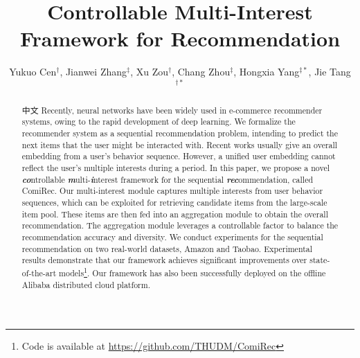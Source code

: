 \documentclass[sigconf]{acmart}
\newcommand{\model}{{ComiRec}}
\begin{document}
\fancyhead{}

\title{Controllable Multi-Interest Framework for Recommendation}

\author[Y. Cen, J. Zhang, X. Zou, C. Zhou, H. Yang and J. Tang]{
    Yukuo Cen$^{\dagger}$, Jianwei Zhang$^{\ddagger}$, Xu Zou$^{\dagger}$, Chang Zhou$^{\ddagger}$, Hongxia Yang$^{\ddagger*}$, Jie Tang$^{\dagger*}$
}


\renewcommand{\authors}{Yukuo Cen, Jianwei Zhang, Xu Zou, Chang Zhou, Hongxia Yang and Jie Tang}
\renewcommand{\shortauthors}{Y. Cen et al.}


\begin{abstract}
\renewcommand{\thefootnote}{\fnsymbol{footnote}}
\renewcommand{\thefootnote}{\arabic{footnote}}

中文
Recently, neural networks have been widely used in e-commerce recommender systems, owing to the rapid development of deep learning. 
We formalize the recommender system as a sequential recommendation problem, intending to predict the next items that the user might be interacted with. 
Recent works usually give an overall embedding from a user's behavior sequence. However, a unified user embedding cannot reflect the user's multiple interests during a period. 
In this paper, we propose a novel \textbf{\textit{co}}ntrollable \textbf{\textit{m}}ulti-\textbf{\textit{i}}nterest framework for the sequential \textbf{\textit{rec}}ommendation, called \model. Our multi-interest module captures multiple interests from user behavior sequences, which can be exploited for retrieving candidate items from the large-scale item pool. These items are then fed into an aggregation module to obtain the overall recommendation. The aggregation module leverages a controllable factor to balance the recommendation accuracy and diversity. 
We conduct experiments for the sequential recommendation on two real-world datasets, Amazon and Taobao. Experimental results demonstrate that our framework achieves significant improvements over state-of-the-art models\footnote{Code is available at \url{https://github.com/THUDM/ComiRec}}. 
Our framework has also been successfully deployed on the offline Alibaba distributed cloud platform. %
\end{abstract}
\end{document}

